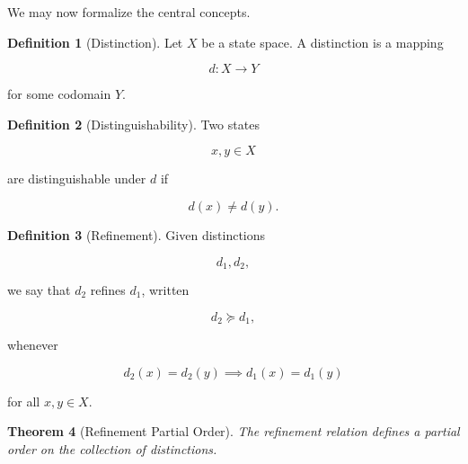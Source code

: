 \documentclass[12pt,oneside]{article}
\newtheorem{theorem}{Theorem}[section] \newtheorem{lemma}[theorem]{Lemma} \newtheorem{proposition}[theorem]{Proposition} \newtheorem{corollary}[theorem]{Corollary}
\theoremstyle{definition}
\newtheorem{definition}[theorem]{Definition} \newtheorem{axiom}[theorem]{Axiom} \newtheorem{remark}[theorem]{Remark} \newtheorem{example}[theorem]{Example}
\begin{document}
We may now formalize the central concepts.

\begin{definition}[Distinction]

Let \(X\) be a state space. A distinction is a mapping

\[
d:X\rightarrow Y
\]

for some codomain \(Y\).

\end{definition}

\begin{definition}[Distinguishability]

Two states

\[
x,y\in X
\]

are distinguishable under \(d\) if

\[
d(x)\neq d(y).
\]

\end{definition}

\begin{definition}[Refinement]

Given distinctions

\[
d_1,d_2,
\]

we say that \(d_2\) refines \(d_1\), written

\[
d_2\succeq d_1,
\]

whenever

\[
d_2(x)=d_2(y)
\implies
d_1(x)=d_1(y)
\]

for all \(x,y\in X\).

\end{definition}

\begin{theorem}[Refinement Partial Order]

The refinement relation defines a partial order on the collection of distinctions.

\end{theorem}
\end{document}
